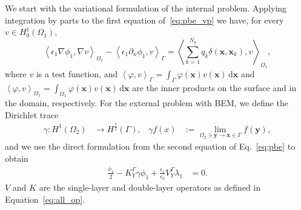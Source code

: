 We start with the variational formulation of the internal problem. Applying integration by parts to the first equation of~\eqref{eq:pbe_vp} we have, for every $v \in H_0^1(\Omega_1)$,
% 
\begin{equation}
\label{eq:fem}
 \left\langle \epsilon_1 \nabla \phi_1, \nabla v \right\rangle_{\Omega_1}  -  \left\langle  \epsilon_1\partial_n \phi_1, v \right\rangle_\Gamma =  \left\langle \sum_{k=1}^{N_q} q_k\delta(\mathbf{x},\mathbf{x}_k),  v\right\rangle_{\Omega_1},
\end{equation}
%
where $v$ is a test function, and $\left\langle\varphi,v\right\rangle_\Gamma = \int_\Gamma \varphi(\mathbf{x})v(\mathbf{x})\,\mathrm{d}\mathbf{x}$ and $\left\langle\varphi,v\right\rangle_{\Omega_1} = \int_{\Omega_1} \varphi(\mathbf{x})v(\mathbf{x})\,\mathrm{d}\mathbf{x}$ are the inner products on the surface and in the domain, respectively.
For the external problem with BEM, we define the Dirichlet trace~\cite{MR2361676} 
\begin{align*}
\gamma:  H^1(\Omega_2) &\rightarrow H^{\frac{1}{2}}(\Gamma), & \gamma f(x) & := \lim_{\Omega_2 \ni \mathbf{y} \rightarrow \mathbf{x} \in \Gamma}  f(\mathbf{y}),
\end{align*}
and we use the direct formulation from the second equation of Eq.~\eqref{eq:pbe} to obtain
\begin{align*}
\tfrac{\phi_1}{2} - K_{Y}^{\Gamma}\gamma \phi_1 + \tfrac{\epsilon_1}{\epsilon_2}V_{Y}^{\Gamma}  \lambda_1 & = 0.
\end{align*}
$V$ and $K$ are the single-layer and double-layer operators as defined in Equation~\eqref{eq:all_op}.
%
%
%
%


